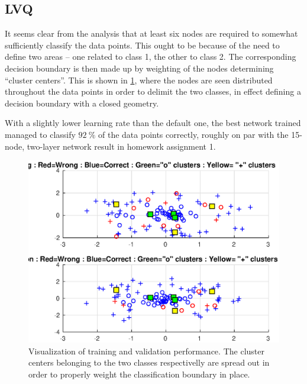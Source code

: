 \documentclass[a4paper,12pt]{article}
\theoremstyle{plain}
\theoremstyle{definition}
\begin{document}
      \subsection{LVQ} 
      It seems clear from the analysis that at least six nodes are required to
      somewhat sufficiently classify the data points. This ought to be because
      of the need to define two areas -- one related to class 1, the
      other to class 2. The corresponding decision boundary is then made up by
      weighting of the nodes determining ``cluster centers''. This is shown in 
      \cref{fig:9}, where the nodes are seen distributed throughout the data
      points in order to delimit the two classes, in
      effect defining a decision boundary with a closed geometry. 
      
      With a slightly lower learning rate than the default one, the best network 
      trained managed to classify $92~\%$ of the data points correctly, roughly on par with the
      15-node, two-layer network result in homework assignment 1.  
      
      \begin{figure}[H]
         \centering
         \includegraphics[scale=.6]{9}
         \caption{Visualization of training and validation performance. The
         cluster centers belonging to the two classes respectivelly are spread
      out in order to properly weight the classification boundary in place.}
         \label{fig:9}
      \end{figure}
\end{document}
